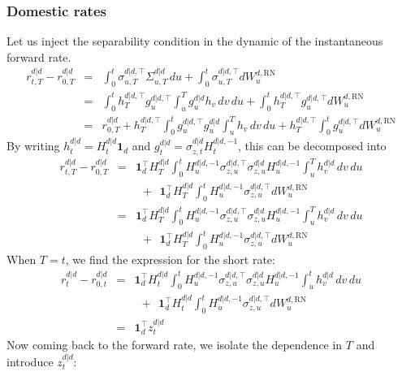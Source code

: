 \documentclass[11pt,english]{amsart}
\newcommand{\vun}{\mathbf{1}}
\newcommand{\RN}{\mathrm{RN}}
\theoremstyle{definition}
\begin{document}
\subsubsection{Domestic rates}
Let us inject the separability condition in the dynamic of the instantaneous forward rate.
\begin{eqnarray*}
  r^{d|d}_{t,T} - r^{d|d}_{0,T} &=&  \int_0^t \sigma^{d|d,\top}_{u,T} \Sigma^{d|d}_{u,T} \, du +  \int_0^t \sigma^{d|d,\top}_{u,T} dW^{d,\RN}_u   \\
  &=& \int_0^t h^{d|d,\top}_{T} g^{d|d,\top}_{u} \int_u^T g^{d|d}_{u} h_v \, dv  \, du 
  +  \int_0^t h^{d|d,\top}_{T} g^{d|d,\top}_{u} dW^{d,\RN}_u   \\
  &=& r^{d|d}_{0,T} + h^{d|d,\top}_{T} \int_0^t  g^{d|d,\top}_{u} g^{d|d}_{u} \int_u^T  h_v \, dv  \, du 
  + h^{d|d,\top}_{T} \int_0^t  g^{d|d,\top}_{u} dW^{d,\RN}_u   
\end{eqnarray*}
By writing $h^{d|d}_t =  H^{d|d}_t\vun_d$ and $g^{d|d}_t = \sigma^{d|d}_{z,t} H^{d|d,-1}_t$, this can be decomposed into 
\begin{eqnarray*}
  r^{d|d}_{t,T}  - r^{d|d}_{0,T} 
  &=&  \vun_d^\top H^{d|d}_{T}\int_0^t H^{d|d,-1}_{u}  \sigma^{d|d,\top}_{z,u}   \sigma^{d|d}_{z,u}  H^{d|d,-1}_{u} \int_u^T    h^{d|d}_{v}  \, dv   \, du  \\
  & &   ~~ + ~~ \vun_d^{\top} H^{d|d}_{T}   \int_0^t   H^{d|d,-1}_{u} \sigma^{d|d,\top}_{z,u}  dW^{d,\RN}_u   \\
  &=&  \vun_d^\top H^{d|d}_{T} \int_0^t H^{d|d,-1}_{u} \sigma^{d|d,\top}_{z,u} \sigma^{d|d}_{z,u}  H^{d|d,-1}_{u}    \int_u^T   h^{d|d}_{v} \, dv   \, du  \\
  & &   ~~ + ~~ \vun_d^{\top} H^{d|d}_{T}   \int_0^t   H^{d|d,-1}_{u} \sigma^{d|d,\top}_{z,u}  dW^{d,\RN}_u   \end{eqnarray*}
When $T=t$, we find the expression for the short rate:
\begin{eqnarray*}
  r^{d|d}_{t}  - r^{d|d}_{0,t} 
  &=&  \vun_d^\top H^{d|d}_{t}\int_0^t H^{d|d,-1}_{u}  \sigma^{d|d,\top}_{z,u}   \sigma^{d|d}_{z,u}  H^{d|d,-1}_{u} \int_u^t    h^{d|d}_{v}  \, dv   \, du  \\
  & &   ~~ + ~~ \vun_d^{\top} H^{d|d}_{t}   \int_0^t   H^{d|d,-1}_{u} \sigma^{d|d,\top}_{z,u}  dW^{d,\RN}_u   \\
  &=& \vun_d^{\top} z^{d|d}_t 
\end{eqnarray*}
Now coming back to the forward rate, we isolate the dependence in $T$ and introduce $z^{d|d}_t$: 
\end{document}
